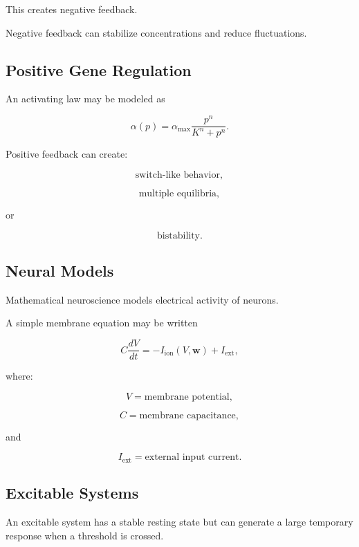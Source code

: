 This creates negative feedback.

Negative feedback can stabilize concentrations and reduce fluctuations.

\subsection{Positive Gene Regulation}
\label{subsec:positive-gene-regulation}

An activating law may be modeled as

\[
\boxed{
\alpha(p)
=
\alpha_{\max}
\frac{p^n}
{K^n+p^n}.
}
\]

Positive feedback can create:

\[
\boxed{
\text{switch-like behavior},
}
\]

\[
\boxed{
\text{multiple equilibria},
}
\]

or

\[
\boxed{
\text{bistability}.
}
\]

\subsection{Neural Models}
\label{subsec:neural-models}

Mathematical neuroscience models electrical activity of neurons.

A simple membrane equation may be written

\[
\boxed{
C\frac{dV}{dt}
=
-I_{\mathrm{ion}}(V,\mathbf{w})
+
I_{\mathrm{ext}},
}
\]

where:

\[
V
=
\text{membrane potential},
\]

\[
C
=
\text{membrane capacitance},
\]

and

\[
I_{\mathrm{ext}}
=
\text{external input current}.
\]

\subsection{Excitable Systems}
\label{subsec:excitable-systems}

An excitable system has a stable resting state but can generate a large
temporary response when a threshold is crossed.

